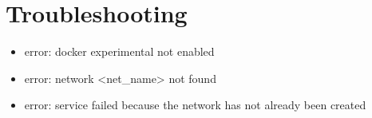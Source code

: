 \section{Troubleshooting}

\begin{itemize}

\item error: docker experimental not enabled

\item error: network <net\_name> not found

\item error: service failed because the network has not already been created

\end{itemize}
